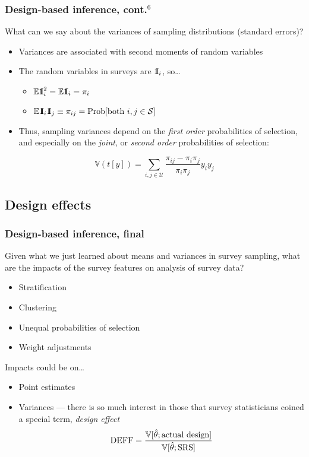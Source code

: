 \documentclass[aspectratio=43]{beamer}
\newcommand{\Expect}{\mathbb{E}}
\newcommand{\Var}{\mathbb{V}}
\newcommand{\One}{{\rm 1\kern-0.3em I}}
\begin{document}
\begin{frame}\frametitle{Design-based inference, cont.$^6$}

What can we say about the variances of sampling distributions (standard errors)?

\begin{itemize}
    \item Variances are associated with second moments of random variables
    \item The random variables in surveys are $\One_i$, so\ldots
        \begin{itemize}
            \item $\Expect \One_i^2 = \Expect \One_i = \pi_i$
            \item $\Expect \One_i \One_j \equiv \pi_{ij} = {\rm Prob}[\mbox{both }i,j \in \mathcal{S}]$
        \end{itemize}
    \item Thus, sampling variances depend on the \textit{first order}
        probabilities of selection, and especially on the
        \textit{joint}, or \textit{second order} probabilities of selection:
\end{itemize}

$$
\Var( t[y] ) = \sum_{i, j\in\mathcal{U}} \frac{\pi_{ij}-\pi_i \pi_j}{\pi_i \pi_j} y_i y_j
$$

\end{frame}

\subsection{Design effects}

\begin{frame}\frametitle{Design-based inference, final}

Given what we just learned about means and variances in survey sampling, what are the impacts of
the survey features on analysis of survey data?

\begin{itemize}
    \item Stratification
    \item Clustering
    \item Unequal probabilities of selection
    \item Weight adjustments
\end{itemize}

Impacts could be on\ldots
\begin{itemize}
    \item Point estimates
    \item Variances --- there is so much interest in those that survey statisticians coined a special term,
        \textit{design effect}
        $$
            {\rm DEFF} = \frac{\Var[\hat\theta; \mbox{actual design}]}{\Var[\hat\theta; \mbox{SRS}]}
        $$
\end{itemize}

\end{frame}
\end{document}
